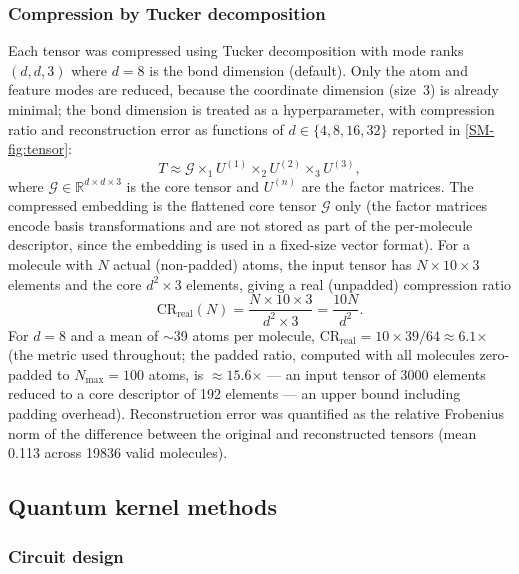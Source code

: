 \documentclass[11pt,a4paper]{article}
\begin{document}
\subsubsection{Compression by Tucker decomposition}

Each tensor was compressed using Tucker decomposition \citep{tensorly_2019} with mode ranks $(d, d, 3)$ where $d = 8$ is the bond dimension (default). Only the atom and feature modes are reduced, because the coordinate dimension (size~3) is already minimal; the bond dimension is treated as a hyperparameter, with compression ratio and reconstruction error as functions of $d \in \{4, 8, 16, 32\}$ reported in \cref{SM-fig:tensor}:
\begin{equation}
T \approx \mathcal{G} \times_1 U^{(1)} \times_2 U^{(2)} \times_3 U^{(3)},
\end{equation}
where $\mathcal{G} \in \mathbb{R}^{d \times d \times 3}$ is the core tensor and $U^{(n)}$ are the factor matrices. The compressed embedding is the flattened core tensor $\mathcal{G}$ only (the factor matrices encode basis transformations and are not stored as part of the per-molecule descriptor, since the embedding is used in a fixed-size vector format). For a molecule with $N$ actual (non-padded) atoms, the input tensor has $N \times 10 \times 3$ elements and the core $d^2 \times 3$ elements, giving a real (unpadded) compression ratio
\begin{equation}
\mathrm{CR}_{\text{real}}(N) = \frac{N \times 10 \times 3}{d^2 \times 3} = \frac{10N}{d^2}.
\end{equation}
For $d = 8$ and a mean of $\sim$39 atoms per molecule, $\mathrm{CR}_{\text{real}} = 10 \times 39 / 64 \approx \num{6.1}$$\times$ (the metric used throughout; the padded ratio, computed with all molecules zero-padded to $N_{\max}=100$ atoms, is $\approx \num{15.6}$$\times$ --- an input tensor of \num{3000} elements reduced to a core descriptor of \num{192} elements --- an upper bound including padding overhead). Reconstruction error was quantified as the relative Frobenius norm of the difference between the original and reconstructed tensors (mean \num{0.113} across \num{19836} valid molecules).

\subsection{Quantum kernel methods}

\subsubsection{Circuit design}
\end{document}
